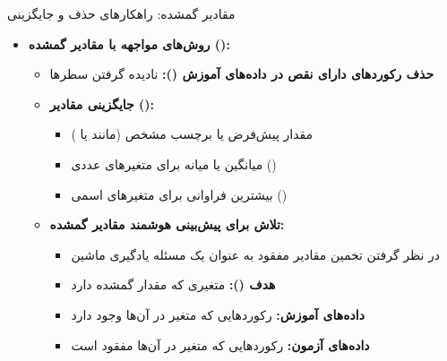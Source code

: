 \begin{frame}{مقادیر گمشده: راهکارهای حذف و جایگزینی}
\begin{itemize}
  \item \textbf{روش‌های مواجهه با مقادیر گمشده ():}
  \begin{itemize}
    \item \textbf{حذف رکوردهای دارای نقص در داده‌های آموزش ():} نادیده گرفتن سطرها
    \item \textbf{جایگزینی مقادیر ():}
    \begin{itemize}
      \item مقدار پیش‌فرض یا برچسب مشخص (مانند  یا )
      \item میانگین یا میانه برای متغیرهای عددی ()
      \item بیشترین فراوانی برای متغیرهای اسمی ()
    \end{itemize}
    \vspace{0.05cm}
    \vspace{0.05cm}
    \item \textbf{تلاش برای پیش‌بینی هوشمند مقادیر گمشده:}
    \begin{itemize}
      \item در نظر گرفتن تخمین مقادیر مفقود به عنوان یک مسئله یادگیری ماشین
      \item \textbf{هدف ():} متغیری که مقدار گمشده دارد
      \item \textbf{داده‌های آموزش:} رکوردهایی که متغیر در آن‌ها وجود دارد
      \item \textbf{داده‌های آزمون:} رکوردهایی که متغیر در آن‌ها مفقود است
    \end{itemize}
    \vspace{0.05cm}
  \end{itemize}
\end{itemize}
\end{frame}


